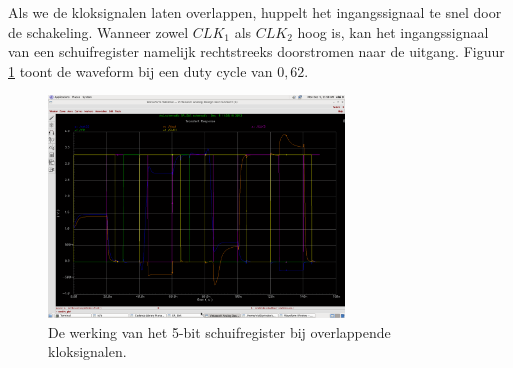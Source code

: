 \documentclass[11pt,a4paper,oneside,dutch]{article}
\begin{document}
Als we de kloksignalen laten overlappen, huppelt het ingangssignaal te snel door de schakeling. Wanneer zowel $CLK_1$ als $CLK_2$ hoog is, kan het ingangssignaal van een schuifregister namelijk rechtstreeks doorstromen naar de uitgang. Figuur \ref{fig:wave_overlap} toont de waveform bij een duty cycle van $0,62$.

\begin{figure}[htp]
	\centering
	\includegraphics[width=0.7\textwidth]{wave_overlap.png}
	\caption{De werking van het 5-bit schuifregister bij overlappende kloksignalen.} %
	\label{fig:wave_overlap}
\end{figure}
\end{document}
